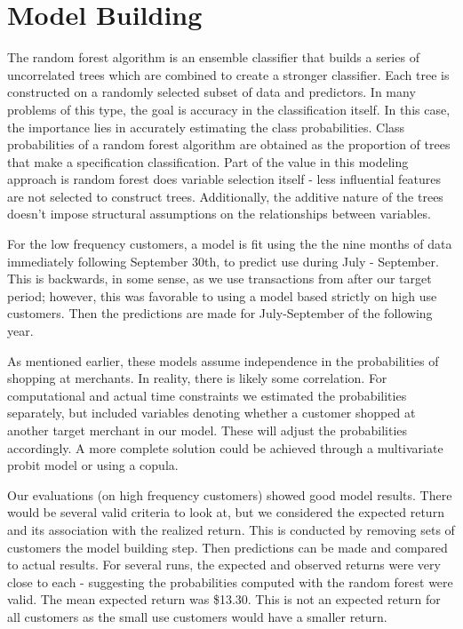 \documentclass[12pt]{article} %
\begin{document}
\section{Model Building}
The random forest algorithm is an ensemble classifier that builds a series of uncorrelated trees which are combined to create a stronger classifier.  Each tree is constructed on a randomly selected subset of data and predictors.  In many problems of this type, the goal is accuracy in the classification itself.  In this case, the importance lies in accurately estimating the class probabilities.  Class probabilities of a random forest algorithm are obtained as the proportion of trees that make a specification classification.  Part of the value in this modeling approach is random forest does variable selection itself - less influential features are not selected to construct trees.  Additionally, the additive nature of the trees doesn't impose structural assumptions on the relationships between variables.

For the low frequency customers, a model is fit using the the nine months of data immediately following September 30th, to predict use during July - September.  This is backwards, in some sense, as we use transactions from after our target period; however, this was favorable to using a model based strictly on high use customers.  Then the predictions are made for July-September of the following year.

As mentioned earlier, these models assume independence in the probabilities of shopping at merchants.  In reality, there is likely some correlation.  For computational and actual time constraints we estimated the probabilities separately, but included variables denoting whether a customer shopped at another target merchant in our model.  These will adjust the probabilities accordingly.  A more complete solution could be achieved through a multivariate probit model or using a copula.

Our evaluations (on high frequency customers) showed good model results.  There would be several valid criteria to look at, but we considered the expected return and its association with the realized return.  This is conducted by removing sets of customers the model building step.  Then predictions can be made and compared to actual results.  For several runs, the expected and observed returns were very close to each - suggesting the probabilities computed with the random forest were valid.  The mean expected return was \$13.30.  This is not an expected return for all customers as the small use customers would have a smaller return.
 
\end{document}
